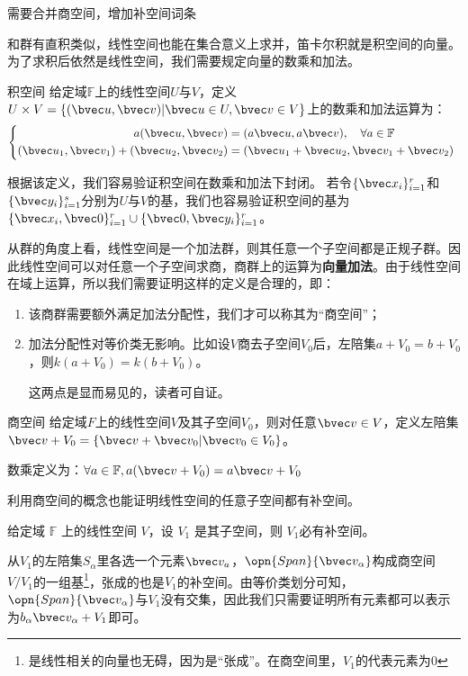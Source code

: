 

\begin{issues}
\issueTODO 需要合并商空间，增加补空间词条
\end{issues}


和群有直积类似，线性空间也能在集合意义上求并，笛卡尔积就是积空间的向量。为了求积后依然是线性空间，我们需要规定向量的数乘和加法。

\begin{definition}{积空间}
给定域$\mathbb F $上的线性空间$U$与$V$，定义$U\times V=\{(\bvec u,\bvec v)|\bvec u\in U,\bvec v\in V\}$上的数乘和加法运算为：
\begin{equation}
\left\{\begin{aligned}
a(\bvec u,\bvec v)&=(a\bvec u,a\bvec v),\quad \forall a\in \mathbb F\\
(\bvec u_1,\bvec v_1)+(\bvec u_2,\bvec v_2)&=(\bvec u_1+\bvec u_2,\bvec v_1+\bvec v_2)
\end{aligned}\right.~
\end{equation}
\end{definition}
根据该定义，我们容易验证积空间在数乘和加法下封闭。
若令$\{\bvec x_i\}^r_{i=1}$和$\{\bvec y_i\}^s_{i=1}$分别为$U$与$V$的基，我们也容易验证积空间的基为$\{\bvec x_i,\bvec 0\}^r_{i=1}\cup \{\bvec 0,\bvec y_i\}^r_{i=1}$。

从群的角度上看，线性空间是一个加法群，则其任意一个子空间都是正规子群。因此线性空间可以对任意一个子空间求商，商群上的运算为\textbf{向量加法}。由于线性空间在域上运算，所以我们需要证明这样的定义是合理的，即：
\begin{enumerate}
\item 该商群需要额外满足加法分配性，我们才可以称其为“商空间”；
\item 加法分配性对等价类无影响。比如设$V$商去子空间$V_0$后，左陪集$a+V_0=b+V_0$，则$k(a+V_0)=k(b+V_0)$。

这两点是显而易见的，读者可自证。
\end{enumerate}
\begin{definition}{商空间}
给定域$F$上的线性空间$V$及其子空间$V_0$，则对任意$\bvec v\in V$，定义左陪集$\bvec v+V_0=\{\bvec v+\bvec v_0|\bvec v_0\in V_0\}$。

数乘定义为：$\forall a\in \mathbb F,a(\bvec v+V_0)=a\bvec v+V_0$
\end{definition}


利用商空间的概念也能证明线性空间的任意子空间都有补空间。
\begin{theorem}{}\label{the_lnal06_1}
给定域 $\mathbb F$ 上的线性空间 $V$，设 $V_1$ 是其子空间，则 $V_1$必有补空间。
\end{theorem}
从$V_1$的左陪集${S_{\alpha}}$里各选一个元素$\bvec v_a$，$\opn{Span} \{\bvec v_{\alpha}\}$构成商空间$V/V_1$的一组基\footnote{是线性相关的向量也无碍，因为是“张成”。在商空间里，$V_1$的代表元素为$0$}，张成的也是$V_1$的补空间。由等价类划分可知，$\opn{Span} \{\bvec v_{\alpha}\}$与$V_1$没有交集，因此我们只需要证明所有元素都可以表示为$b_{\alpha}\bvec v_{\alpha}+V_1$即可。

